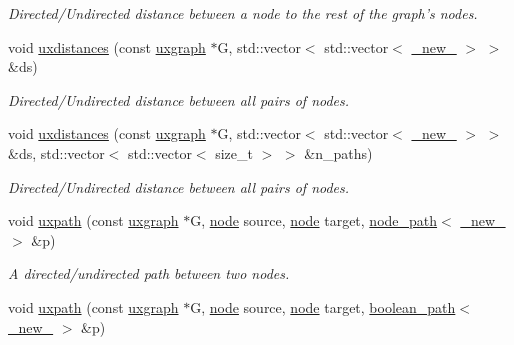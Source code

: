 \begin{DoxyCompactItemize}
\begin{DoxyCompactList}\small\item\em Directed/\-Undirected distance between a node to the rest of the graph's nodes. \end{DoxyCompactList}\item 
void \hyperlink{namespacelgraph_1_1traversal_a401cf82c5e153e82a73f4be9d5d75288}{uxdistances} (const \hyperlink{classlgraph_1_1uxgraph}{uxgraph} $\ast$G, std\-::vector$<$ std\-::vector$<$ \hyperlink{namespacelgraph_a2836f966c1c36b43da337d8907728ec0}{\-\_\-new\-\_\-} $>$ $>$ \&ds)
\begin{DoxyCompactList}\small\item\em Directed/\-Undirected distance between all pairs of nodes. \end{DoxyCompactList}\item 
void \hyperlink{namespacelgraph_1_1traversal_ad372437fe4156af974637e9908a0f284}{uxdistances} (const \hyperlink{classlgraph_1_1uxgraph}{uxgraph} $\ast$G, std\-::vector$<$ std\-::vector$<$ \hyperlink{namespacelgraph_a2836f966c1c36b43da337d8907728ec0}{\-\_\-new\-\_\-} $>$ $>$ \&ds, std\-::vector$<$ std\-::vector$<$ size\-\_\-t $>$ $>$ \&n\-\_\-paths)
\begin{DoxyCompactList}\small\item\em Directed/\-Undirected distance between all pairs of nodes. \end{DoxyCompactList}\item 
void \hyperlink{namespacelgraph_1_1traversal_a143fd991f5e035c64c94b2ac8d84b08c}{uxpath} (const \hyperlink{classlgraph_1_1uxgraph}{uxgraph} $\ast$G, \hyperlink{namespacelgraph_a397169dd66adf725210a30fb7251773e}{node} source, \hyperlink{namespacelgraph_a397169dd66adf725210a30fb7251773e}{node} target, \hyperlink{classlgraph_1_1node__path}{node\-\_\-path}$<$ \hyperlink{namespacelgraph_a2836f966c1c36b43da337d8907728ec0}{\-\_\-new\-\_\-} $>$ \&p)
\begin{DoxyCompactList}\small\item\em A directed/undirected path between two nodes. \end{DoxyCompactList}\item 
void \hyperlink{namespacelgraph_1_1traversal_a5873d9c87596daa9002ee537e1ac0252}{uxpath} (const \hyperlink{classlgraph_1_1uxgraph}{uxgraph} $\ast$G, \hyperlink{namespacelgraph_a397169dd66adf725210a30fb7251773e}{node} source, \hyperlink{namespacelgraph_a397169dd66adf725210a30fb7251773e}{node} target, \hyperlink{classlgraph_1_1boolean__path}{boolean\-\_\-path}$<$ \hyperlink{namespacelgraph_a2836f966c1c36b43da337d8907728ec0}{\-\_\-new\-\_\-} $>$ \&p)

\end{DoxyCompactItemize}

